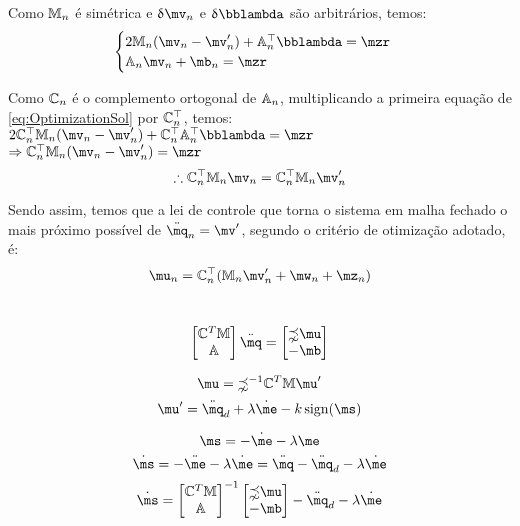 Como $\mathbb{M}_n$ \'e sim\'etrica e $\dl \mv_n$ e $\dl \mlambda$ s\~ao arbitr\'arios, temos:
\begin{equation} \label{eq:OptimizationSol}
\begin{cases}
2 \mM_n (\mv_n - \mv'_n) + \mA_n^\top \mlambda = \mzr \\
\mA_n \mv_n + \mb_n = \mzr
\end{cases}
\end{equation}

Como $\mathbb{C}_n$ é o complemento ortogonal de $\mathbb{A}_n$, multiplicando a primeira equa\c{c}\~ao de \eqref{eq:OptimizationSol} por $\mathbb{C}_n^\top$, temos: \\

$ 2 \mC_n^\top \mM_n (\mv_n - \mv'_n) + \mC_n^\top \mA_n^\top \mlambda = \mzr $
$ \Rightarrow  \mC_n^\top \mM_n (\mv_n - \mv'_n)  = \mzr $
\begin{equation} \label{eq:OptimizationSol2}
\therefore \mC_n^\top \mM_n \mv_n  = \mC_n^\top \mM_n  \mv'_n
\end{equation}

Sendo assim, temos que a lei de controle que torna o sistema em malha fechado o mais pr\'oximo poss\'ivel de $\ddot{\mq}_n = \mv'$, segundo o crit\'erio de otimiza\c{c}\~ao adotado, \'e:
\begin{equation} \label{eq:ControlLawFinal}
\mu_n = \mC_n^\top ( \mM_n \mv'_n + \mw_n + \mz_n )
\end{equation}

\newpage

\\

$$
\begin{bmatrix}
\mC^T \mM \\
\mA
\end{bmatrix}
\ddot{\mq}
=
\begin{bmatrix}
\mathbb{\zeta} \mu \\
-\mb
\end{bmatrix}
$$



$$ \mu = \mathbb{\zeta}^{-1} \mC^T \mM \mu' $$
$$ \mu' = \ddot{\mq}_d + \lambda \dot{\me} - k  \sign (\ms) $$

$$ \ms = - \dot{\me} - \lambda \me $$
$$ \dot{\ms} = - \ddot{\me} - \lambda \dot{\me} = \ddot{\mq} - \ddot{\mq}_d  - \lambda \dot{\me} $$
$$ \dot{\ms} =  \begin{bmatrix}
\mC^T \mM \\
\mA
\end{bmatrix}^{-1}
\begin{bmatrix}
\mathbb{\zeta} \mu \\
-\mb
\end{bmatrix}
 - \ddot{\mq}_d  - \lambda \dot{\me} $$
 
